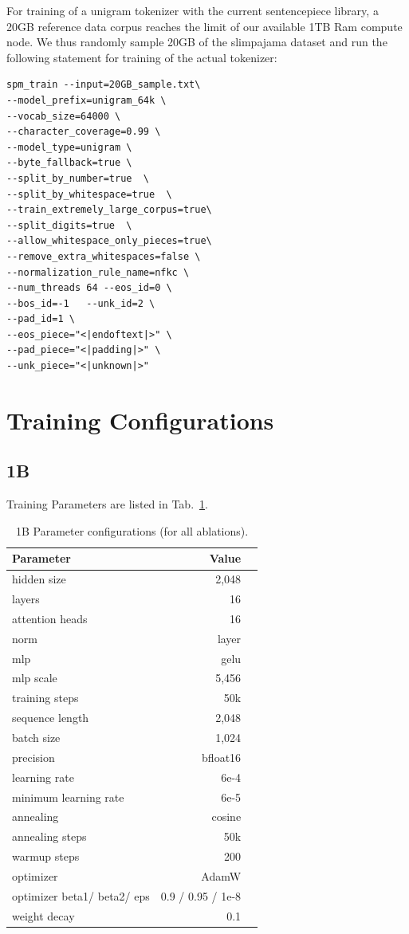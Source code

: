 \documentclass[11pt]{article}
\begin{document}
For training of a unigram tokenizer with the current sentencepiece library, a 20GB reference data corpus reaches the limit of our available 1TB Ram compute node.
We thus randomly sample 20GB of the slimpajama dataset and run the following statement for training of the actual tokenizer: 
\begin{lstlisting}
spm_train --input=20GB_sample.txt\
--model_prefix=unigram_64k \
--vocab_size=64000 \
--character_coverage=0.99 \
--model_type=unigram \
--byte_fallback=true \
--split_by_number=true  \
--split_by_whitespace=true  \
--train_extremely_large_corpus=true\
--split_digits=true  \
--allow_whitespace_only_pieces=true\
--remove_extra_whitespaces=false \
--normalization_rule_name=nfkc \
--num_threads 64 --eos_id=0 \
--bos_id=-1   --unk_id=2 \
--pad_id=1 \
--eos_piece="<|endoftext|>" \
--pad_piece="<|padding|>" \
--unk_piece="<|unknown|>"
\end{lstlisting}

\section{Training Configurations}
\label{app:training_parameters}
\subsection{1B}
Training Parameters are listed in Tab.~\ref{tab:1b_parameters}.

\begin{table}[]
    \centering
\begin{tabular}{lrr}
\toprule
         Parameter & Value \\
\midrule
hidden size & 2,048 \\
layers &  16 \\
attention heads & 16 \\
norm & layer \\
mlp & gelu \\
mlp scale & 5,456 \\
training steps & 50k \\
sequence length & 2,048 \\
batch size & 1,024 \\
\midrule
precision & bfloat16 \\
learning rate &  6e-4 \\
minimum learning rate & 6e-5 \\
annealing & cosine \\
annealing steps & 50k \\
warmup steps & 200 \\
optimizer & AdamW \\
optimizer beta1/ beta2/ eps & 0.9 / 0.95 / 1e-8 \\
weight decay & 0.1 \\
\bottomrule
    \end{tabular}
    \caption{1B Parameter configurations (for all ablations).}
    \label{tab:1b_parameters}
\end{table}
\end{document}
